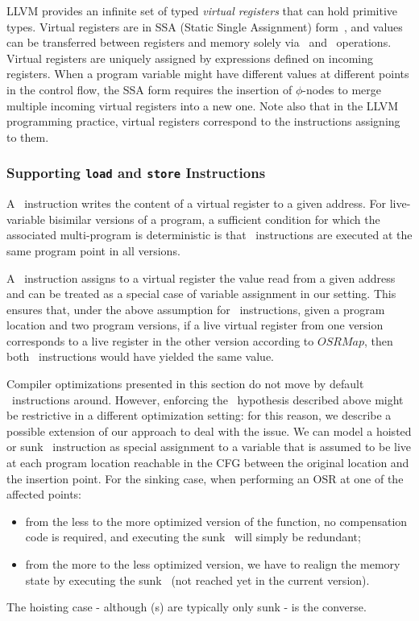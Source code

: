 LLVM provides an infinite set of typed {\em virtual registers} that can hold primitive types. Virtual registers are in SSA (Static Single Assignment) form~\cite{Cytron91}, and values can be transferred between registers and memory solely via \load\ and \store\ operations. Virtual registers are uniquely assigned by expressions defined on incoming registers. When a program variable might have different values at different points in the control flow, the SSA form requires the insertion of $\phi$-nodes to merge multiple incoming virtual registers into a new one. Note also that in the LLVM programming practice, virtual registers correspond to the instructions assigning to them.

\subsubsection*{Supporting \texttt{load} and \texttt{store} Instructions}
A \store\ instruction writes the content of a virtual register to a given address. For live-variable bisimilar versions of a program, a sufficient condition for which the associated multi-program is deterministic is that \store\ instructions are executed at the same program point in all versions.

A \load\ instruction assigns to a virtual register the value read from a given address and can be treated as a special case of variable assignment in our setting. This ensures that, under the above assumption for \store\ instructions, given a program location and two program versions, if a live virtual register from one version corresponds to a live register in the other version according to $OSRMap$, then both \load\ instructions would have yielded the same value.

Compiler optimizations presented in this section do not move by default \store\ instructions around. However, enforcing the \store\ hypothesis described above might be restrictive in a different optimization setting: for this reason, we describe a possible extension of our approach to deal with the issue. We can model a hoisted or sunk \store\ instruction as special assignment to a variable that is assumed to be live at each program location reachable in the CFG between the original location and the insertion point. For the sinking case, when performing an OSR at one of the affected points:
\begin{itemize}[itemsep=0pt,parsep=3pt,partopsep=0pt]
 \item from the less to the more optimized version of the function, no compensation code is required, and executing the sunk \store\ will simply be redundant;
 \item from the more to the less optimized version, we have to realign the memory state by executing the sunk \store\ (not reached yet in the current version).
\end{itemize}
The hoisting case - although \store(s) are typically only sunk - is the converse.

